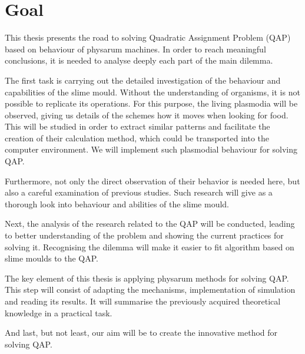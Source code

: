 \section{Goal}
\label{section:introduction_goal}

This thesis presents the road to solving Quadratic Assignment Problem (QAP) based on behaviour of physarum machines. In order to reach meaningful conclusions, it is needed to analyse deeply each part of the main dilemma.

The first task is carrying out the detailed investigation of the behaviour and capabilities of the slime mould. Without the understanding of organisms, it is not possible to replicate its operations. For this purpose, the living plasmodia will be observed, giving us details of the schemes how it moves when looking for food. This will be studied in order to extract similar patterns and facilitate the creation of their calculation method, which could be transported into the computer environment. We will implement such plasmodial behaviour for solving QAP.

Furthermore, not only the direct observation of their behavior is needed here, but also a careful examination of previous studies. Such research will give as a thorough look into behaviour and abilities of the slime mould.

Next, the analysis of the research related to the QAP will be conducted, leading to better understanding of the problem and showing the current practices for solving it. Recognising the dilemma will make it easier to fit algorithm based on slime moulds to the QAP.

The key element of this thesis is applying physarum methods for solving QAP. This step will consist of adapting the mechanisms, implementation of simulation and reading its results. It will summarise the previously acquired theoretical knowledge in a practical task.

And last, but not least, our aim will be to create the innovative method for solving QAP.
